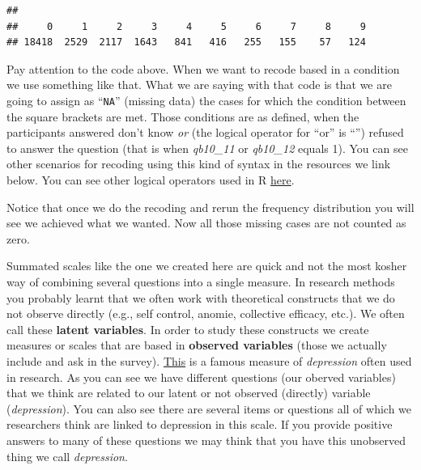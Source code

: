 \documentclass[
]{book}
\newenvironment{Shaded}{\begin{snugshade}}{\end{snugshade}}
\newcommand{\ConstantTok}[1]{\textcolor[rgb]{0.00,0.00,0.00}{#1}}
\newcommand{\DecValTok}[1]{\textcolor[rgb]{0.00,0.00,0.81}{#1}}
\newcommand{\FunctionTok}[1]{\textcolor[rgb]{0.00,0.00,0.00}{#1}}
\newcommand{\NormalTok}[1]{#1}
\newcommand{\OtherTok}[1]{\textcolor[rgb]{0.56,0.35,0.01}{#1}}
\newcommand{\SpecialCharTok}[1]{\textcolor[rgb]{0.00,0.00,0.00}{#1}}
\begin{document}
\begin{Shaded}
\end{Shaded}

\begin{verbatim}
## 
##     0     1     2     3     4     5     6     7     8     9 
## 18418  2529  2117  1643   841   416   255   155    57   124
\end{verbatim}

Pay attention to the code above. When we want to recode based in a condition we use something like that. What we are saying with that code is that we are going to assign as ``\texttt{NA}'' (missing data) the cases for which the condition between the square brackets are met. Those conditions are as defined, when the participants answered don't know \emph{or} (the logical operator for ``or'' is ``\textbar{}'') refused to answer the question (that is when \emph{qb10\_11} or \emph{qb10\_12} equals 1). You can see other scenarios for recoding using this kind of syntax in the resources we link below. You can see other logical operators used in R \href{https://www.datamentor.io/r-programming/operator/}{here}.

Notice that once we do the recoding and rerun the frequency distribution you will see we achieved what we wanted. Now all those missing cases are not counted as zero.

Summated scales like the one we created here are quick and not the most kosher way of combining several questions into a single measure. In research methods you probably learnt that we often work with theoretical constructs that we do not observe directly (e.g., self control, anomie, collective efficacy, etc.). We often call these \textbf{latent variables}. In order to study these constructs we create measures or scales that are based in \textbf{observed variables} (those we actually include and ask in the survey). \href{https://www.ismanet.org/doctoryourspirit/pdfs/Beck-Depression-Inventory-BDI.pdf}{This} is a famous measure of \emph{depression} often used in research. As you can see we have different questions (our oberved variables) that we think are related to our latent or not observed (directly) variable (\emph{depression}). You can also see there are several items or questions all of which we researchers think are linked to depression in this scale. If you provide positive answers to many of these questions we may think that you have this unobserved thing we call \emph{depression}.
\end{document}
